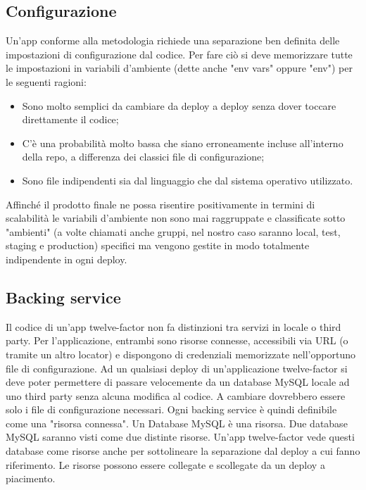 \documentclass[PianoDiQualifica.tex]{subfiles}
\begin{document}
\subsection{Configurazione}
Un'app conforme alla metodologia richiede una separazione ben definita delle impostazioni di configurazione dal codice.
Per fare ciò si deve memorizzare tutte le impostazioni in variabili d'ambiente (dette anche "env vars" oppure "env") per le seguenti ragioni:
\begin{itemize}
\item Sono molto semplici da cambiare da deploy a deploy senza dover toccare direttamente il codice;
\item C'è una probabilità molto bassa che siano erroneamente incluse all'interno della repo, a differenza dei classici file di configurazione;
\item Sono file indipendenti sia dal linguaggio che dal sistema operativo utilizzato.
\end{itemize}
Affinché il prodotto finale ne possa risentire positivamente in termini di scalabilità le variabili d'ambiente non sono mai raggruppate e classificate sotto "ambienti" (a volte chiamati anche gruppi, nel nostro caso saranno local, test, staging e production) specifici ma vengono gestite in modo totalmente indipendente in ogni deploy.

\subsection{Backing service}
Il codice di un'app twelve-factor non fa distinzioni tra servizi in locale o third party. Per l'applicazione, entrambi sono risorse connesse, accessibili via URL (o tramite un altro locator) e dispongono di credenziali memorizzate nell'opportuno file di configurazione. Ad un qualsiasi deploy di un'applicazione twelve-factor si deve poter permettere di passare velocemente da un database MySQL locale ad uno third party senza alcuna modifica al codice. A cambiare dovrebbero essere solo i file di configurazione necessari.
Ogni backing service è quindi definibile come una "risorsa connessa". Un Database MySQL è una risorsa. Due database MySQL saranno visti come due distinte risorse. Un'app twelve-factor vede questi database come risorse anche per sottolineare la separazione dal deploy a cui fanno riferimento. Le risorse possono essere collegate e scollegate da un deploy a piacimento.
\end{document}

